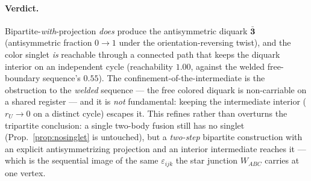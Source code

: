 \documentclass[11pt]{article}
\theoremstyle{definition}
\newcommand{\rep}[1]{\mathbf{#1}}      %
\begin{document}
\paragraph{Verdict.} Bipartite-\emph{with}-projection \emph{does} produce the
antisymmetric diquark $\bar{\rep 3}$ (antisymmetric fraction $0\!\to\!1$ under the
orientation-reversing twist), and the color singlet \emph{is} reachable through a
connected path that keeps the diquark interior on an independent cycle (reachability
$1.00$, against the welded free-boundary sequence's $0.55$). The
confinement-of-the-intermediate is the obstruction to the \emph{welded} sequence ---
the free colored diquark is non-carriable on a shared register --- and it is
\emph{not} fundamental: keeping the intermediate interior ($r_U\!\to\!0$ on a
distinct cycle) escapes it. This refines rather than overturns the tripartite
conclusion: a single two-body fusion still has no singlet (Prop.~\ref{prop:nosinglet}
is untouched), but a \emph{two-step} bipartite construction with an explicit
antisymmetrizing projection and an interior intermediate reaches it --- which is the
sequential image of the same $\varepsilon_{ijk}$ the star junction $W_{ABC}$ carries
at one vertex.
\end{document}
